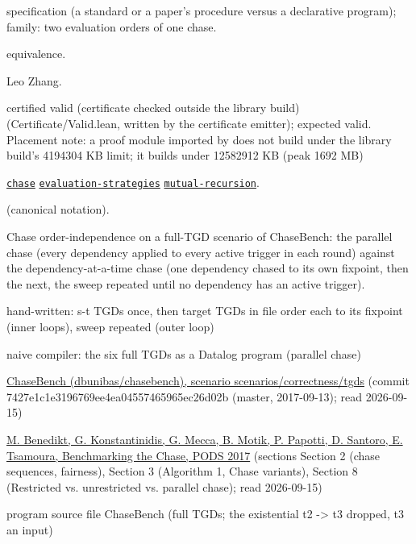 \documentclass[10pt]{article}
\begin{document}
\begin{description}[leftmargin=2.6cm,style=nextline,itemsep=1pt]

\item[Category] specification (a standard or a paper's procedure versus a declarative program); family: two evaluation orders of one chase.

\item[Kind] equivalence.

\item[Contributors] Leo Zhang.

\item[Status] certified valid (certificate checked outside the library build) (Certificate/Valid.lean, written by the certificate emitter); expected valid. Placement note: a proof module imported by  does not build under the library build's 4194304 KB limit; it builds under 12582912 KB (peak 1692 MB)

\item[Tags] \hyperref[tag:chase]{\texttt{chase}} \hyperref[tag:evaluation-strategies]{\texttt{evaluation-strategies}} \hyperref[tag:mutual-recursion]{\texttt{mutual-recursion}}.

\item[Input]  (canonical notation).

\item[Summary] Chase order-independence on a full-TGD scenario of ChaseBench: the parallel chase (every dependency applied to every active trigger in each round) against the dependency-at-a-time chase (one dependency chased to its own fixpoint, then the next, the sweep repeated until no dependency has an active trigger).

\item[Sides] hand-written: s-t TGDs once, then target TGDs in file order each to its fixpoint (inner loops), sweep repeated (outer loop) \par naive compiler: the six full TGDs as a Datalog program (parallel chase)

\item[Sources] {\raggedright \href{https://github.com/dbunibas/chasebench}{ChaseBench (dbunibas/chasebench), scenario scenarios/correctness/tgds} (commit 7427e1c1e3196769ee4ea04557465965ec26d02b (master, 2017-09-13); read 2026-09-15) \par \href{https://doi.org/10.1145/3034786.3034796}{M. Benedikt, G. Konstantinidis, G. Mecca, B. Motik, P. Papotti, D. Santoro, E. Tsamoura, Benchmarking the Chase, PODS 2017} (sections Section 2 (chase sequences, fairness), Section 3 (Algorithm 1, Chase variants), Section 8 (Restricted vs. unrestricted vs. parallel chase); read 2026-09-15) \par program source file ChaseBench  (full TGDs; the existential t2 -\textgreater{} t3 dropped, t3 an input)\par}


\end{description}
\end{document}
